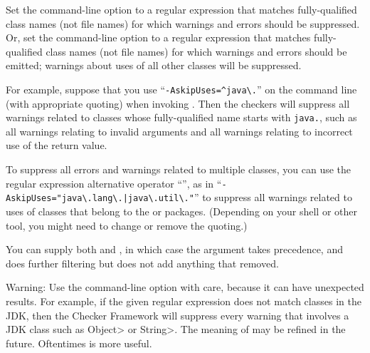 Set the  command-line option to a
regular expression that matches fully-qualified class names (not file names) for which warnings and errors
should be suppressed.
Or, set the  command-line option to a
regular expression that matches fully-qualified class names (not file names) for which warnings and errors
should be emitted; warnings about uses of all other classes will be suppressed.

For example, suppose that you use
``{\codesize\verb|-AskipUses=^java\.|}'' on the command line
(with appropriate quoting) when invoking
.  Then the checkers will suppress all warnings related to
classes whose fully-qualified name starts with \codesize\verb|java.|, such
as all warnings relating to invalid arguments and all warnings relating to
incorrect use of the return value.

To suppress all errors and warnings related to multiple classes, you can use
the regular expression alternative operator ``\code{|}'', as in
``{\codesize\verb+-AskipUses="java\.lang\.|java\.util\."+}'' to suppress
all warnings related to uses of classes that belong to the  or
 packages.  (Depending on your shell or other tool, you
might need to change or remove the quoting.)

You can supply both  and , in which case
the  argument takes precedence, and  does
further filtering but does not add anything that  removed.

Warning:  Use the  command-line option with care,
because it can have unexpected results.  For example, if the
given regular expression does not match classes in the JDK, then the
Checker Framework will suppress every warning that involves a JDK class
such as \<Object> or \<String>.  The meaning of  may be
refined in the future.  Oftentimes  is more useful.




